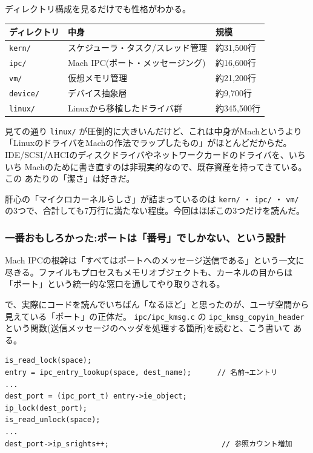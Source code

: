 \documentclass[11pt]{article}
\begin{document}
ディレクトリ構成を見るだけでも性格がわかる。

\begin{center}
\begin{tabular}{lll}
ディレクトリ & 中身 & 規模\\
\hline
\texttt{kern/} & スケジューラ・タスク/スレッド管理 & 約31,500行\\
\texttt{ipc/} & Mach IPC(ポート・メッセージング) & 約16,600行\\
\texttt{vm/} & 仮想メモリ管理 & 約21,200行\\
\texttt{device/} & デバイス抽象層 & 約9,700行\\
\texttt{linux/} & Linuxから移植したドライバ群 & 約345,500行\\
\end{tabular}
\end{center}

見ての通り \texttt{linux/} が圧倒的に大きいんだけど、これは中身がMachというより
「LinuxのドライバをMachの作法でラップしたもの」がほとんどだからだ。
IDE/SCSI/AHCIのディスクドライバやネットワークカードのドライバを、いちいち
Machのために書き直すのは非現実的なので、既存資産を持ってきている。この
あたりの「潔さ」は好きだ。

肝心の「マイクロカーネルらしさ」が詰まっているのは \texttt{kern/} ・ \texttt{ipc/} ・ \texttt{vm/}
の3つで、合計しても7万行に満たない程度。今回はほぼこの3つだけを読んだ。
\subsubsection{一番おもしろかった:ポートは「番号」でしかない、という設計}
\label{sec:org1e78284}

Mach IPCの根幹は「すべてはポートへのメッセージ送信である」という一文に
尽きる。ファイルもプロセスもメモリオブジェクトも、カーネルの目からは
「ポート」という統一的な窓口を通してやり取りされる。

で、実際にコードを読んでいちばん「なるほど」と思ったのが、ユーザ空間から
見えている「ポート」の正体だ。 \texttt{ipc/ipc\_kmsg.c} の \texttt{ipc\_kmsg\_copyin\_header}
という関数(送信メッセージのヘッダを処理する箇所)を読むと、こう書いて
ある。

\begin{verbatim}
is_read_lock(space);
entry = ipc_entry_lookup(space, dest_name);      // 名前→エントリ
...
dest_port = (ipc_port_t) entry->ie_object;
ip_lock(dest_port);
is_read_unlock(space);
...
dest_port->ip_srights++;                          // 参照カウント増加
\end{verbatim}
\end{document}
